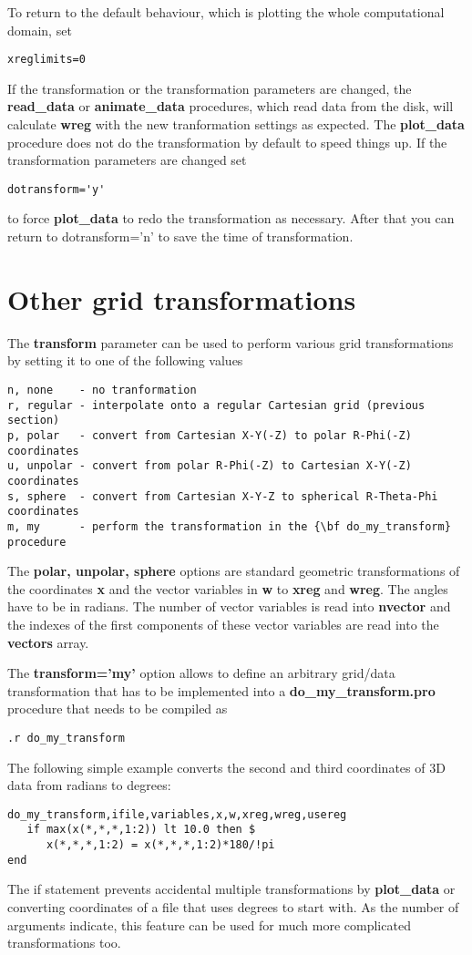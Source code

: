 \documentclass{article}
\begin{document}
To return to the default behaviour, which is plotting the whole 
computational domain, set
\begin{verbatim}
xreglimits=0
\end{verbatim}
If the transformation or the transformation parameters are changed,
the {\bf read\_data} or {\bf animate\_data} procedures, which read data from
the disk, will calculate {\bf wreg} with the new tranformation settings
as expected. The {\bf plot\_data} procedure does not do the transformation
by default to speed things up. If the transformation parameters are changed set
\begin{verbatim}
dotransform='y'
\end{verbatim}
to force {\bf plot\_data} to redo the transformation as necessary.
After that you can return to dotransform='n' to save the time of
transformation.

\section{Other grid transformations \label{s-gridtransform}}

The {\bf transform} parameter can be used to perform various
grid transformations by setting it to one of the following values
\begin{verbatim}
n, none    - no tranformation
r, regular - interpolate onto a regular Cartesian grid (previous section)
p, polar   - convert from Cartesian X-Y(-Z) to polar R-Phi(-Z) coordinates
u, unpolar - convert from polar R-Phi(-Z) to Cartesian X-Y(-Z) coordinates
s, sphere  - convert from Cartesian X-Y-Z to spherical R-Theta-Phi coordinates
m, my      - perform the transformation in the {\bf do_my_transform} procedure
\end{verbatim}
The {\bf polar, unpolar, sphere} options are standard geometric
transformations of the coordinates {\bf x} and the vector variables in
{\bf w} to {\bf xreg} and {\bf wreg}. The angles have to be in
radians.  The number of vector variables is read into {\bf nvector}
and the indexes of the first components of these vector variables are
read into the {\bf vectors} array.

The {\bf transform='my'} 
option allows to define an arbitrary grid/data transformation
that has to be implemented into a {\bf do\_my\_transform.pro}
procedure that needs to be compiled as
\begin{verbatim}
.r do_my_transform
\end{verbatim}
The following simple example converts the second and third coordinates 
of 3D data from radians to degrees:
\begin{verbatim}
do_my_transform,ifile,variables,x,w,xreg,wreg,usereg
   if max(x(*,*,*,1:2)) lt 10.0 then $
      x(*,*,*,1:2) = x(*,*,*,1:2)*180/!pi
end
\end{verbatim}
The if statement prevents accidental multiple transformations 
by {\bf plot\_data} or converting coordinates of a file that uses 
degrees to start with.
As the number of arguments indicate, this feature can be used for much more 
complicated transformations too.
\end{document}

